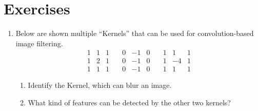 \section*{Exercises}\small
\begin{enumerate}
\item Below are shown multiple ``Kernels'' that can be used for convolution-based image filtering. 
\begin{equation}
\nonumber
\begin{array}{|c|c|c}
\hline
1 & 1 & 1\\
\hline
1 & 2 & 1\\
\hline
1 & 1 & 1
\end{array}
\quad
\begin{array}{|c|c|c}
\hline
0 & -1 & 0\\
\hline
0 & -1 & 0\\
\hline
0 & -1 & 0
\end{array}
\quad
\begin{array}{|c|c|c}
\hline
1 & 1 & 1\\
\hline
1 & -4 & 1\\
\hline
1 & 1 & 1
\end{array}
\end{equation}
\begin{enumerate}
\item Identify the Kernel, which can blur an image.
\item What kind of features can be detected by the other two kernels?
\end{enumerate} 
\end{enumerate} \normalsize